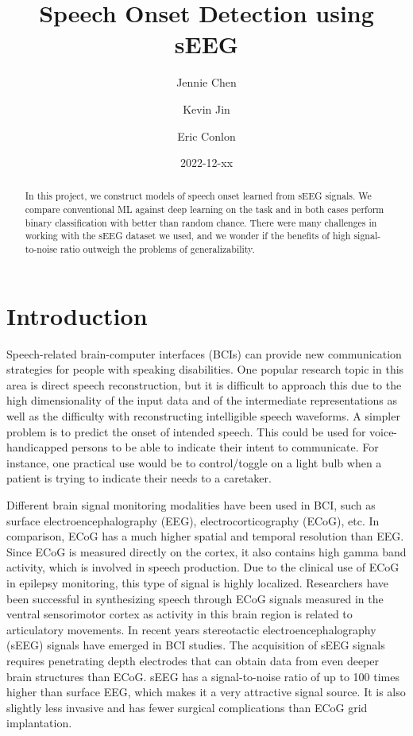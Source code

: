 \documentclass[format=sigconf, nonacm=true, review=true, screen=true]{acmart}
\title{Speech Onset Detection using sEEG}
\author{Jennie Chen}
\author{Kevin Jin}
\author{Eric Conlon}
\date{2022-12-xx}
\begin{document}
\begin{abstract}

In this project, we construct models of speech onset learned from sEEG signals. We compare conventional ML against deep learning on the task and in both cases perform binary classification with better than random chance. There were many challenges in working with the sEEG dataset we used, and we wonder if the benefits of high signal-to-noise ratio outweigh the problems of generalizability.

\end{abstract}

\maketitle

\section{Introduction}

Speech-related brain-computer interfaces (BCIs) can provide new communication strategies for people with speaking disabilities. One popular research topic in this area is direct speech reconstruction, but it is difficult to approach this due to the high dimensionality of the input data and of the intermediate representations as well as the difficulty with reconstructing intelligible speech waveforms. \cite{saha2019deep} A simpler problem is to predict the onset of intended speech. This could be used for voice-handicapped persons to be able to indicate their intent to communicate. For instance, one practical use would be to control/toggle on a light bulb when a patient is trying to indicate their needs to a caretaker.

Different brain signal monitoring modalities have been used in BCI, such as surface electroencephalography (EEG), electrocorticography (ECoG), etc. \cite{herff2020potential} In comparison, ECoG has a much higher spatial and temporal resolution than EEG. \cite{parvizi2018promises} Since ECoG is measured directly on the cortex, it also contains high gamma band activity, which is involved in speech production. \cite{herff2020potential} Due to the clinical use of ECoG in epilepsy monitoring, this type of signal is highly localized. Researchers have been successful in synthesizing speech through ECoG signals measured in the ventral sensorimotor cortex as activity in this brain region is related to articulatory movements. \cite{chartier2018encoding, anumanchipalli2018intelligible} In recent years stereotactic electroencephalography (sEEG) signals have emerged in BCI studies. The acquisition of sEEG signals requires penetrating depth electrodes that can obtain data from even deeper brain structures than ECoG. \cite{herff2020potential} sEEG has a signal-to-noise ratio of up to 100 times higher than surface EEG, which makes it a very attractive signal source. It is also slightly less invasive and has fewer surgical complications than ECoG grid implantation. \cite{herff2020potential}
\end{document}
